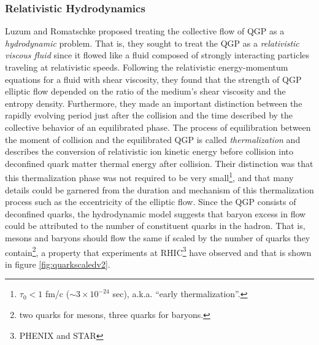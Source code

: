 \subsubsection{Relativistic Hydrodynamics}
Luzum and Romatschke \citep{PhysRevC.78.034915} proposed treating the collective flow of QGP as a \textit{hydrodynamic} problem. That is, they sought to treat the QGP as a \textit{relativistic viscous fluid} since it flowed like a fluid composed of strongly interacting particles traveling at relativistic speeds. Following the relativistic energy-momentum equations for a fluid with shear viscosity, they found that the strength of QGP elliptic flow depended on the ratio of the medium's shear viscosity and the entropy density. Furthermore, they made an important distinction between the rapidly evolving period just after the collision and the time described by the collective behavior of an equilibrated phase. The process of equilibration between the moment of collision and the equilibrated QGP is called \textit{thermalization} and describes the conversion of relativistic ion kinetic energy before collision into deconfined quark matter thermal energy after collision. Their distinction was that this thermalization phase was not required to be very small\footnote{$\tau_0 < 1$ fm/c ($\sim 3 \times 10^{-24}$ sec), a.k.a. ``early thermalization''.}, and that many details could be garnered from the duration and mechanism of this thermalization process such as the eccentricity of the elliptic flow. Since the QGP consists of deconfined quarks, the hydrodynamic model suggests that baryon excess in flow could be attributed to the number of constituent quarks in the hadron. That is, mesons and baryons should flow the same if scaled by the number of quarks they contain\footnote{two quarks for mesons, three quarks for baryons.}, a property that experiments at RHIC\footnote{PHENIX and STAR} have observed and that is shown in figure \ref{fig:quarkscaledv2}.

